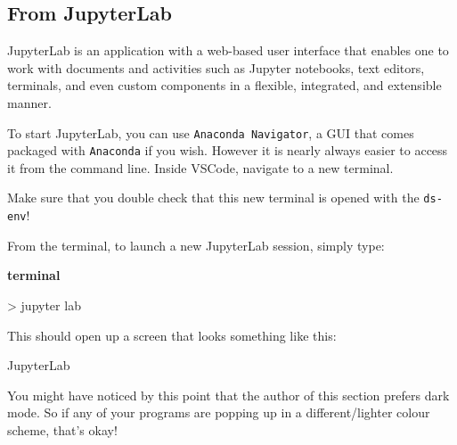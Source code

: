 \documentclass[
  letterpaper,
  DIV=11,
  numbers=noendperiod]{scrreprt}
\newenvironment{Shaded}{\begin{snugshade}}{\end{snugshade}}
\newcommand{\ExtensionTok}[1]{\textcolor[rgb]{0.00,0.23,0.31}{#1}}
\newcommand{\NormalTok}[1]{\textcolor[rgb]{0.00,0.23,0.31}{#1}}
\newcommand{\OperatorTok}[1]{\textcolor[rgb]{0.37,0.37,0.37}{#1}}
\begin{document}
\hypertarget{from-jupyterlab}{%
\subsection{From JupyterLab}\label{from-jupyterlab}}

JupyterLab is an application with a web-based user interface that
enables one to work with documents and activities such as Jupyter
notebooks, text editors, terminals, and even custom components in a
flexible, integrated, and extensible manner.

To start JupyterLab, you can use \texttt{Anaconda\ Navigator}, a GUI
that comes packaged with \texttt{Anaconda} if you wish. However it is
nearly always easier to access it from the command line. Inside VSCode,
navigate to a new terminal.

\begin{tcolorbox}[enhanced jigsaw, rightrule=.15mm, opacitybacktitle=0.6, colback=white, toprule=.15mm, colframe=quarto-callout-tip-color-frame, bottomtitle=1mm, bottomrule=.15mm, arc=.35mm, coltitle=black, breakable, title=\textcolor{quarto-callout-tip-color}{\faLightbulb}\hspace{0.5em}{Conda Reminder!}, titlerule=0mm, opacityback=0, colbacktitle=quarto-callout-tip-color!10!white, left=2mm, toptitle=1mm, leftrule=.75mm]
Make sure that you double check that this new terminal is opened with
the \texttt{ds-env}!
\end{tcolorbox}

From the terminal, to launch a new JupyterLab session, simply type:

\textbf{terminal}

\begin{Shaded}
\begin{Highlighting}[]
\OperatorTok{\textgreater{}}\NormalTok{ jupyter }\ExtensionTok{lab}
\end{Highlighting}
\end{Shaded}

This should open up a screen that looks something like this:

JupyterLab

\begin{tcolorbox}[enhanced jigsaw, rightrule=.15mm, opacitybacktitle=0.6, colback=white, toprule=.15mm, colframe=quarto-callout-tip-color-frame, bottomtitle=1mm, bottomrule=.15mm, arc=.35mm, coltitle=black, breakable, title=\textcolor{quarto-callout-tip-color}{\faLightbulb}\hspace{0.5em}{Fun Fact}, titlerule=0mm, opacityback=0, colbacktitle=quarto-callout-tip-color!10!white, left=2mm, toptitle=1mm, leftrule=.75mm]
You might have noticed by this point that the author of this section
prefers dark mode. So if any of your programs are popping up in a
different/lighter colour scheme, that's okay!
\end{tcolorbox}
\end{document}
